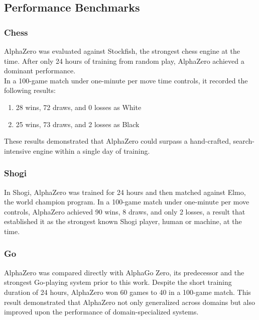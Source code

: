 \subsection{Performance Benchmarks}

\subsubsection{Chess}
AlphaZero was evaluated against Stockfish, the strongest chess engine at the time. After only 24 hours of training from random play, AlphaZero achieved a dominant performance. \\
In a 100-game match under one-minute per move time controls, it recorded the following results: \\
\begin{enumerate}
    \item 28 wins, 72 draws, and 0 losses as White
    \item 25 wins, 73 draws, and 2 losses as Black
\end{enumerate}
These results demonstrated that AlphaZero could surpass a hand-crafted, search-intensive engine within a single day of training. \\

\subsubsection{Shogi}
In Shogi, AlphaZero was trained for 24 hours and then matched against Elmo, the world champion program. In a 100-game match under one-minute per move controls, AlphaZero achieved 90 wins, 8 draws, and only 2 losses, a result that established it as the strongest known Shogi player, human or machine, at the time. \\

\subsubsection{Go}

AlphaZero was compared directly with AlphaGo Zero, its predecessor and the strongest Go-playing system prior to this work. Despite the short training duration of 24 hours, AlphaZero won 60 games to 40 in a 100-game match. This result demonstrated that AlphaZero not only generalized across domains but also improved upon the performance of domain-specialized systems.



